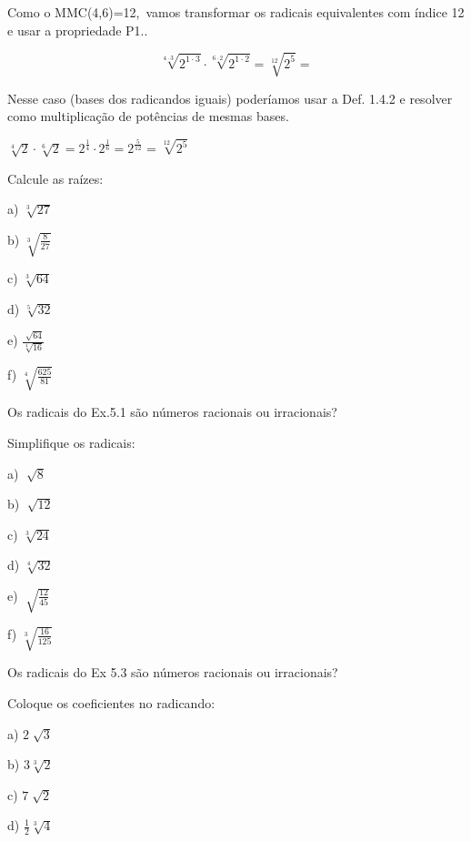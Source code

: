 Como o MMC(4,6)=12,~vamos transformar os radicais equivalentes com índice  12 e usar a propriedade P1..

 \[ \sqrt[4 \cdot 3]{2^{1 \cdot 3}} \cdot \sqrt[6 \cdot 2]{2^{1 \cdot 2}}=\sqrt[12]{2^{5}}= \] 

Nesse caso (bases dos radicandos iguais) poderíamos usar a Def. 1.4.2 e resolver como multiplicação de potências de mesmas bases.

 \( \sqrt[4]{2} \cdot \sqrt[6]{2}=2^{\frac{1}{4}} \cdot 2^{\frac{1}{6}}=2^{\frac{5}{12}}=\sqrt[12]{2^{5}}~~~~~ \) \qedsymbol{}

\begin{exercicios}
	
	\exitem{} Calcule as raízes:

\begin{multicols}{6}
	
	a) \( \sqrt[3]{27} \)
	
	b)  \( \sqrt[3]{\frac{8}{27}} \)
	
	c)  \( \sqrt[3]{64} \)
	
	d)  \( \sqrt[5]{32} \)
	
	e)  \( \frac{\sqrt[]{64}}{\sqrt[4]{16}} \)
	
	f)  \( \sqrt[4]{\frac{625}{81}} \) 
\end{multicols}

	\exitem{} Os radicais do Ex.5.1 são números racionais ou irracionais?

	\exitem{} Simplifique os radicais:
	\begin{multicols}{6}

		 a) \(\sqrt[]{8} \)
		 
		 b)  \( \sqrt[]{12} \)
		 
		 c)  \( \sqrt[3]{24} \)
		 
		 d)  \( \sqrt[4]{32} \) 
		 
		 e)  \( \sqrt[]{\frac{12}{45}} \)
		 
		 f)  \( \sqrt[3]{\frac{16}{125}} \)
	\end{multicols}
	\exitem{} Os radicais do Ex 5.3 são números racionais ou irracionais?

	\exitem{} Coloque os coeficientes no radicando:
	\begin{multicols}{6}

	a) \( 2 \sqrt[]{3} \)
	
	b)  \( 3 \sqrt[3]{2} \)
	
	c)  \( 7 \sqrt[]{2} \)
	
	d)  \( \frac{1}{2}\sqrt[3]{4} \)
	

\end{multicols}
\end{exercicios}
